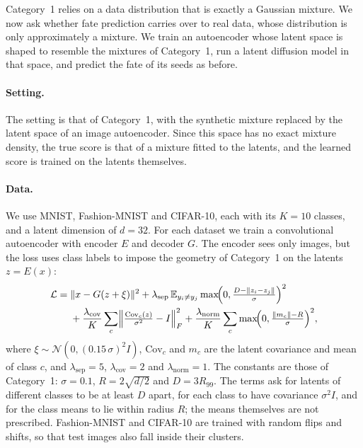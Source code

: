 \documentclass[11pt]{article}
\begin{document}
Category~1 relies on a data distribution that is exactly a Gaussian mixture. We now ask whether
fate prediction carries over to real data, whose distribution is only approximately a mixture. We
train an autoencoder whose latent space is shaped to resemble the mixtures of Category~1, run a
latent diffusion model in that space, and predict the fate of its seeds as before.

\paragraph{Setting.}
The setting is that of Category~1, with the synthetic mixture replaced by the latent space of an
image autoencoder. Since this space has no exact mixture density, the true score is that of a
mixture fitted to the latents, and the learned score is trained on the latents themselves.

\paragraph{Data.}
We use MNIST, Fashion-MNIST and CIFAR-10, each with its $K = 10$ classes, and a latent dimension
of $d = 32$. For each dataset we train a convolutional autoencoder with encoder $E$ and decoder
$G$. The encoder sees only images, but the loss uses class labels to impose the geometry of
Category~1 on the latents $z = E(x)$:
\begin{equation}
\begin{aligned}
    \mathcal{L} = \; & \|x - G(z + \xi)\|^2
    + \lambda_{\text{sep}}\, \mathbb{E}_{y_i \ne y_j} \max\!\Bigl(0, \tfrac{D - \|z_i - z_j\|}{\sigma}\Bigr)^{2} \\
    & + \frac{\lambda_{\text{cov}}}{K} \sum_{c} \Bigl\| \tfrac{\mathrm{Cov}_c(z)}{\sigma^2} - I \Bigr\|_F^2
    + \frac{\lambda_{\text{norm}}}{K} \sum_{c} \max\!\Bigl(0, \tfrac{\|m_c\| - R}{\sigma}\Bigr)^{2},
\end{aligned}
\end{equation}
where $\xi \sim \mathcal{N}(0, (0.15\,\sigma)^2 I)$, $\mathrm{Cov}_c$ and $m_c$ are the latent
covariance and mean of class $c$, and $\lambda_{\text{sep}} = 5$, $\lambda_{\text{cov}} = 2$ and
$\lambda_{\text{norm}} = 1$. The constants are those of Category~1: $\sigma = 0.1$,
$R = 2\sqrt{d/2}$ and $D = 3R_{99}$. The terms ask for latents of different classes to be at least
$D$ apart, for each class to have covariance $\sigma^2 I$, and for the class means to lie within
radius $R$; the means themselves are not prescribed. Fashion-MNIST and CIFAR-10 are trained with
random flips and shifts, so that test images also fall inside their clusters.
\end{document}
